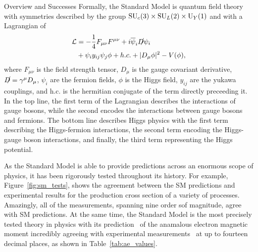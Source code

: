 \begin{section}{Overview and Successes}
Formally, the Standard Model is quantum field theory with symmetries described by the group $\mathrm{SU}_c(3) \times \mathrm{SU}_L(2) \times \mathrm{U}_Y(1)$ and with a Lagrangian of
\begin{align}
\mathcal{L} &= -\frac{1}{4}F_{\mu\nu}F^{\mu\nu} \nonumber + i\overline{\psi}_i\slashed{D}\psi_i \\
            &+ \psi_{i}y_{ij}\psi_{j}\phi + h.c. \nonumber + |D_{\mu}\phi|^2 - V(\phi),
\end{align}
where $F_{\mu\nu}$ is the field strength tensor, $D_{\mu}$ is the gauge covariant derivative, $\slashed{D} = \gamma^{\mu}D_{\mu}$, $\psi_{i}$ are the fermion fields, $\phi$ is the Higgs field, $y_{ij}$ are the yukawa couplings, and h.c. is the hermitian conjugate of the term directly preceeding it.
In the top line, the first term of the Lagrangian describes the interactions of gauge bosons, while the second encodes the interactions between gauge bosons and fermions.
The bottom line describes Higgs physics with the first term describing the Higgs-fermion interactions, the second term encoding the Higgs-gauge boson interactions, and finally, the third term representing the Higgs potential.

As the Standard Model is able to provide predictions across an enormous scope of physics, it has been rigorously tested throughout its history.
For example, Figure~\ref{fig:sm_tests}, shows the agreement between the SM predictions and experimental results for the production cross section of a variety of processes.
Amazingly, all of the measurements, spanning nine order sof magnitude, agree with SM predictions.
At the same time, the Standard Model is the most precisely tested theory in physics with its prediction~\cite{PhysRevLett.109.111807} of the anamalous electron magnetic moment incredibly agreeing with experimental measurements~\cite{PhysRevLett.100.120801,PhysRevA.83.052122} at up to fourteen decimal places, as shown in Table~\ref{tab:ae_values}.


\end{section}
